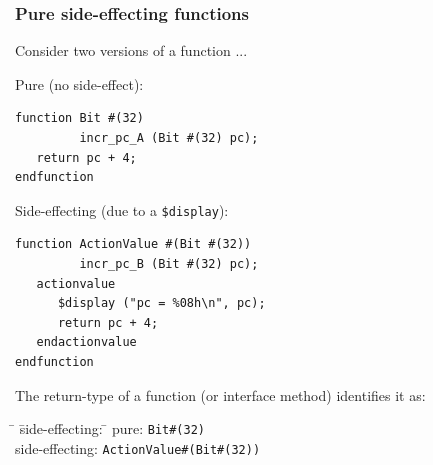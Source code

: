 \begin{frame}[fragile]
\frametitle{Pure {\vs} side-effecting functions}

\footnotesize

Consider two versions of a function ...

\vspace{1ex}

\begin{minipage}{0.3\textwidth}
\hfill Pure (no side-effect):
\end{minipage}
\hm
\begin{minipage}{0.45\textwidth}
\begin{Verbatim}[frame=single]
function Bit #(32)
         incr_pc_A (Bit #(32) pc);
   return pc + 4;
endfunction
\end{Verbatim}
\end{minipage}

\vspace{1ex}

\begin{minipage}{0.3\textwidth}
\hfill Side-effecting (due to a {\tt \$display}):
\end{minipage}
\hm
\begin{minipage}{0.45\textwidth}
\begin{Verbatim}[frame=single]
function ActionValue #(Bit #(32))
         incr_pc_B (Bit #(32) pc);
   actionvalue
      $display ("pc = %08h\n", pc);
      return pc + 4;
   endactionvalue
endfunction
\end{Verbatim}
\end{minipage}

\vspace{2ex}

The return-type of a function (or interface method) identifies it as: \\
\begin{tabbing}
\hmmmm \= {\vs} \= side-effecting: \hm \= \kill
       \>       \> pure:               \> {\tt Bit\#(32)} \\
       \> {\vs} \> side-effecting:     \> {\tt ActionValue\#(Bit\#(32))}
\end{tabbing}

\end{frame}


